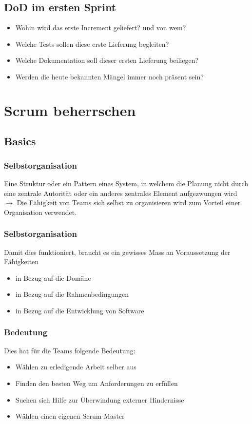 \documentclass{report}
\theoremstyle{definition}
\theoremstyle{example}
\begin{document}
\subsection{DoD im ersten Sprint}
\begin{itemize}
	\item Wohin wird das erste Increment geliefert? und von wem?
	\item Welche Tests sollen diese erste Lieferung begleiten?
	\item Welche Dokumentation soll dieser ersten Lieferung beiliegen?
	\item Werden die heute bekannten Mängel immer noch präsent sein?
\end{itemize}

\section{Scrum beherrschen}

\subsection{Basics}

\subsubsection{Selbstorganisation}
Eine Struktur oder ein Pattern eines System, in welchem die Planung nicht durch eine zentrale Autorität oder ein anderes zentrales Element aufgezwungen wird $\rightarrow$ Die Fähigkeit von Teams sich selbst zu organisieren wird zum Vorteil einer Organisation verwendet.\\

\subsubsection{Selbstorganisation}
Damit dies funktioniert, braucht es ein gewisses Mass an Voraussetzung der Fähigkeiten
\begin{itemize}
	\item in Bezug auf die Domäne
	\item in Bezug auf die Rahmenbedingungen
	\item in Bezug auf die Entwicklung von Software
\end{itemize}

\subsubsection{Bedeutung}
Dies hat für die Teams folgende Bedeutung:
\begin{itemize}
	\item Wählen zu erledigende Arbeit selber aus
	\item Finden den besten Weg um Anforderungen zu erfüllen
	\item Suchen sich Hilfe zur Überwindung externer Hindernisse
	\item Wählen einen eigenen Scrum-Master
\end{itemize}
\end{document}
